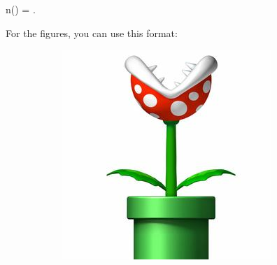 \noindent \blindtext \vspace*{-.75em}
%
	\begin{tcolorbox}[title = Índice de refracción, ams align]
	n(\omega) = .
		\label{eq:indice} 
	\end{tcolorbox}\vspace*{-.75em}

For the figures, you can use this format:
%
	\begin{figure}[h!]\centering
	\begin{subfigure}{.05\textwidth}%
		\caption{}\label{sfig:secondary1}\vspace*{5cm}
	\end{subfigure}
	\begin{subfigure}{.43\textwidth} 
			\includegraphics[width=\linewidth]{1-Esparcimiento/figs/plant}		
	\end{subfigure}
	\begin{subfigure}{.05\textwidth}%
		\vspace{-5cm}\caption{}\label{sfig:secondaty2}
		\end{subfigure}
	\begin{subfigure}{.43\textwidth} 

\end{subfigure}
\end{figure}
